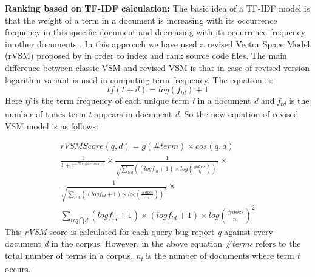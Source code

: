 \documentclass{sig-alternate}
\begin{document}
\textbf{Ranking based on TF-IDF calculation:}
The basic idea of a TF-IDF model is that the weight of a term in a document is increasing with its occurrence frequency in this specific document and decreasing with its occurrence frequency in other documents \cite{Jian}.
In this approach we have used a revised Vector Space Model (rVSM) proposed by \citet{Jian} in order to index and rank source code files. 
The main difference between classic VSM and revised VSM is that in case of revised version logarithm variant is used in computing term frequency. The equation is:
\begin{equation}
tf(t+d)=log(f_{td})+1
\end{equation}
Here \textit{tf} is the term frequency of each unique term \textit{t} in a document \textit{d} and \textit{f\textsubscript{td}} is the number of times term \textit{t} appears in document \textit{d}.
So the new equation of revised VSM model is as follows:


\begin{multline}
rVSMScore(q,d)=g(\#term)\times cos(q,d)
\\
\frac{1}{1+e^{-N(\#terms))}}\times \frac{1}{\sqrt{\sum_{t\epsilon q}}((logf_{tq}+1)\times log(\frac{\#docs}{n_{t}}))^{^{2}}}\times 
\\
\frac{1}{\sqrt{\sum_{t\epsilon d}((log {f_{td}+1})\times log(\frac{\#docs}{n_{t}}))^{2}}}\times
\\
 \sum_{t\epsilon q\bigcap d}(logf_{tq}+1)\times (logf_{td}+1)\times log(\frac{\#docs}{n_{t}})^{2}
\end{multline}
This \textit{rVSM} score is calculated for each query bug report \textit{q} against every document \textit{d} in the corpus. However, in the above equation \textit{\#terms} refers to the total number of terms in a corpus, \textit{n\textsubscript{t}} is the number of documents where term \textit{t} occurs.
\end{document}
